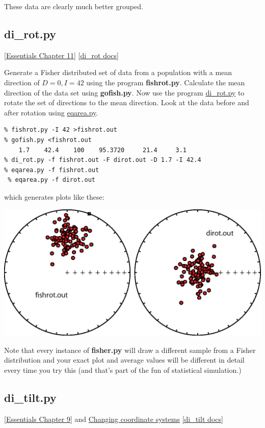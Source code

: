 \documentclass[11pt]{book}
\begin{document}
{{{  \noindent These data are clearly much better grouped.  



\subsection{di\_rot.py}
\href{http://magician.ucsd.edu/Essentials_2/WebBook2ch11.html#ch11}{[Essentials Chapter  11]}
\href{http://earthref.org/PmagPy/pmagpydocs/di_rot-module.html}{[di\_rot docs]}


Generate a Fisher distributed set of data from a population with a mean direction of $D=0, I=42$ using the program {\bf fishrot.py}.  Calculate the mean direction of the data set using {\bf gofish.py}.  Now use the program \href{#di_rot.py}{di\_rot.py} to rotate the set of directions to the mean direction.  Look at the data before and after rotation using \href{#eqarea.py}{eqarea.py}.  

\begin{verbatim}
% fishrot.py -I 42 >fishrot.out
% gofish.py <fishrot.out
    1.7    42.4    100    95.3720     21.4     3.1
% di_rot.py -f fishrot.out -F dirot.out -D 1.7 -I 42.4
% eqarea.py -f fishrot.out
 % eqarea.py -f dirot.out
\end{verbatim}

\noindent  which generates plots like these:

\includegraphics[width=15cm]{EPSfiles/dirot.eps}

Note that every instance of {\bf fisher.py} will draw a different sample from a Fisher distribution and your exact plot and average values will be different in detail every time you try this (and that's part of the fun of statistical simulation.)


\subsection{di\_tilt.py} 
\href{http://magician.ucsd.edu/Essentials_2/WebBook2ch9.html#ch9}{[Essentials Chapter 9]} and
\href{http://magician.ucsd.edu/Essentials_2/WebBook2ap1.html#Changing_coordinate_systems}{Changing coordinate systems}
\href{http://earthref.org/PmagPy/pmagpydocs/di_tilt-module.html}{[di\_tilt docs]}


}}}
\end{document}

